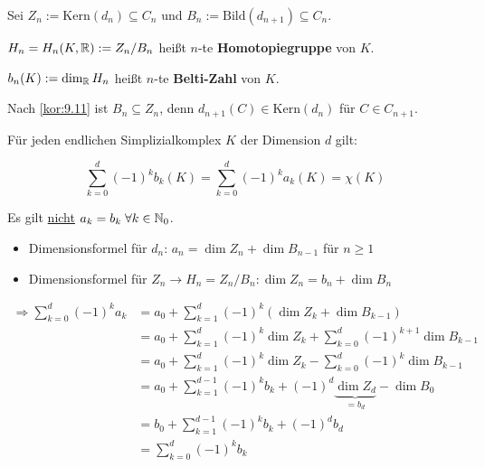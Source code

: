 \begin{definition}%
    Sei $Z_n := \text{Kern}(d_n) \subseteq C_n$ und 
    $B_n := \text{Bild}(d_{n+1}) \subseteq C_n$.

    \begin{defenum}
        \item $H_n = H_n(K, \mathbb{R}) := Z_n / B_n$ heißt $n$-te 
              \textbf{Homotopiegruppe} von $K$.
        \item $b_n(K) := \dim_{\mathbb{R}} H_n$ heißt $n$-te 
              \textbf{Belti-Zahl} von $K$.
    \end{defenum}
\end{definition}

\begin{bemerkung}
    Nach \cref{kor:9.11} ist $B_n \subseteq Z_n$, denn
    $d_{n+1}(C) \in \text{Kern}(d_n)$ für $C \in C_{n+1}$.
\end{bemerkung}

\begin{minipage}{\textwidth}%
\begin{satz}
    Für jeden endlichen Simplizialkomplex $K$ der Dimension $d$ gilt:

    \[\sum_{k=0}^d (-1)^k b_k (K) = \sum_{k=0}^d (-1)^k a_k(K) = \chi(K) \]
\end{satz}
\end{minipage}

\begin{bemerkung}
    Es gilt \underline{nicht} $a_k = b_k\;\forall k \in \mathbb{N}_0$.
\end{bemerkung}

\begin{beweis}\leavevmode
    \begin{itemize}
        \item Dimensionsformel für $d_n$: $a_n = \dim Z_n + \dim B_{n-1}$ für $n \geq 1$
        \item Dimensionsformel für $Z_n \rightarrow H_n = Z_n / B_n: \dim Z_n = b_n + \dim B_n$
    \end{itemize}

    \begin{align*}
        \Rightarrow \sum_{k=0}^d (-1)^k a_k &= a_0 + \sum_{k=1}^d (-1)^k (\dim Z_k + \dim B_{k-1})\\
        &= a_0 + \sum_{k=1}^d (-1)^k \dim Z_k + \sum_{k=0}^d (-1)^{k+1}  \dim B_{k-1}\\
        &= a_0 + \sum_{k=1}^d (-1)^k \dim Z_k - \sum_{k=0}^d (-1)^k  \dim B_{k-1}\\
        &= a_0 + \sum_{k=1}^{d-1} (-1)^k b_k + (-1)^d  \underbrace{\dim Z_d}_{= b_d} - \dim B_0\\
        &= b_0 + \sum_{k=1}^{d-1} (-1)^k b_k + (-1)^d b_d\\
        &= \sum_{k=0}^d (-1)^k b_k
    \end{align*}
\end{beweis}


